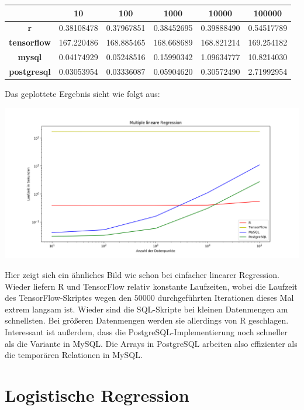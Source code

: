 \begin{center}
  \begin{tabular}{|c|c|c|c|c|c|}\hline
    & \textbf{10} & \textbf{100} & \textbf{1000} & \textbf{10000} & \textbf{100000} \\ \hline
    \textbf{r} & 0.38108478 & 0.37967851 & 0.38452695 & 0.39888490 & 0.54517789 \\ \hline
    \textbf{tensorflow} & 167.220486 & 168.885465 & 168.668689 & 168.821214 & 169.254182 \\ \hline
    \textbf{mysql} & 0.04174929 & 0.05248516 & 0.15990342 & 1.09634777 & 10.8214030 \\ \hline
    \textbf{postgresql} & 0.03053954 & 0.03336087 & 0.05904620 & 0.30572490 & 2.71992954 \\ \hline
  \end{tabular}
\end{center}

Das geplottete Ergebnis sieht wie folgt aus:

\includegraphics[width=\textwidth]{multipleLinearRegressionBenchmark}

Hier zeigt sich ein ähnliches Bild wie schon bei einfacher linearer Regression. Wieder liefern R und TensorFlow relativ konstante Laufzeiten, wobei die Laufzeit des TensorFlow-Skriptes wegen den $50000$ durchgeführten Iterationen dieses Mal extrem langsam ist. Wieder sind die SQL-Skripte bei kleinen Datenmengen am schnellsten. Bei größeren Datenmengen werden sie allerdings von R geschlagen. Interessant ist außerdem, dass die PostgreSQL-Implementierung noch schneller als die Variante in MySQL. Die Arrays in PostgreSQL arbeiten also effizienter als die temporären Relationen in MySQL.

\section{Logistische Regression}
\label{section:4:3}

